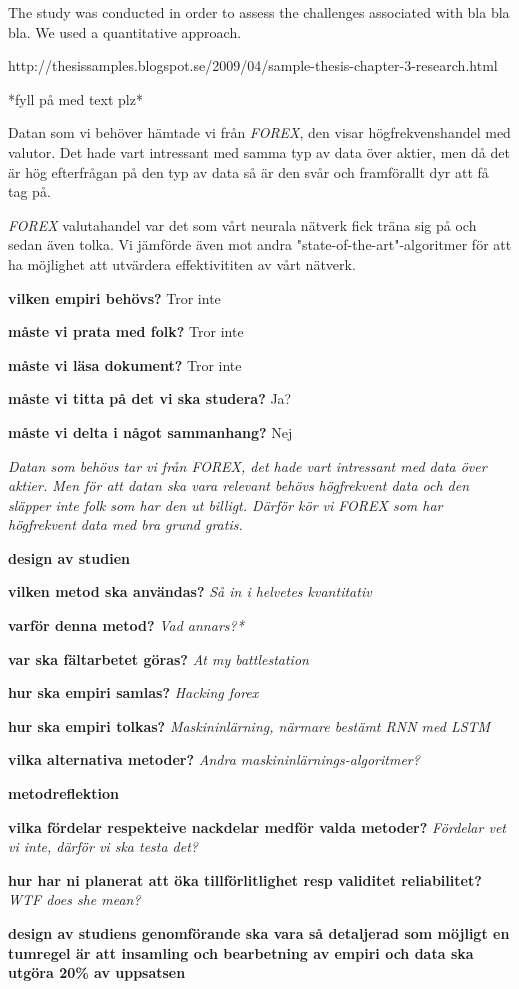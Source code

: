 

The study was conducted in order to assess the challenges associated with bla bla bla. We used a quantitative approach.


http://thesissamples.blogspot.se/2009/04/sample-thesis-chapter-3-research.html

*fyll på med text plz*

Datan som vi behöver hämtade vi från \textit{FOREX}, den visar högfrekvenshandel med valutor. Det hade vart intressant med samma typ av data över aktier, men då det är hög efterfrågan på den typ av data så är den svår och framförallt dyr att få tag på.

\textit{FOREX} valutahandel var det som vårt neurala nätverk fick träna sig på och sedan även tolka. Vi jämförde även mot andra "state-of-the-art"-algoritmer för att ha möjlighet att utvärdera effektivititen av vårt nätverk.

\textbf{vilken empiri behövs?} Tror inte

\textbf{måste vi prata med folk?} Tror inte

\textbf{måste vi läsa dokument?} Tror inte

\textbf{måste vi titta på det vi ska studera?} Ja?

\textbf{måste vi delta i något sammanhang?} Nej

\textit{Datan som behövs tar vi från FOREX, det hade vart intressant med data över aktier. Men för att datan ska vara relevant behövs högfrekvent data och den släpper inte folk som har den ut billigt. Därför kör vi FOREX som har högfrekvent data med bra grund gratis.}

\textbf{design av studien}

\textbf{vilken metod ska användas?}
\textit{Så in i helvetes kvantitativ}

\textbf{varför denna metod?}
\textit{Vad annars?*}

\textbf{var ska fältarbetet göras?}
\textit{At my battlestation}

\textbf{hur ska empiri samlas?}
\textit{Hacking forex}

\textbf{hur ska empiri tolkas?}
\textit{Maskininlärning, närmare bestämt RNN med LSTM}

\textbf{vilka alternativa metoder?}
\textit{Andra maskininlärnings-algoritmer?}

\textbf{metodreflektion}

\textbf{vilka fördelar respekteive nackdelar medför valda metoder?}
\textit{Fördelar vet vi inte, därför vi ska testa det?}

\textbf{hur har ni planerat att öka tillförlitlighet resp validitet reliabilitet?}
\textit{WTF does she mean?}

\textbf{design av studiens genomförande ska vara så detaljerad som möjligt en tumregel är att insamling och bearbetning av empiri och data ska utgöra 20\% av uppsatsen}
